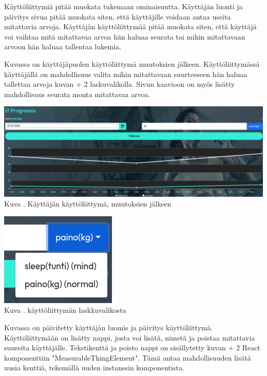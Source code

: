 



Käyttöliittymiä pitää muokata tukemaan ominaisuutta.
Käyttäjän luonti ja päivitys sivua pitää muokata siten, että käyttäjille voidaan antaa useita mitattavia arvoja.
Käyttäjän käyttöliittymää pitää muokata siten,
että käyttäjä voi vaihtaa mitä mitattavaa arvoa hän haluaa seurata tai mihin mitattavaan arvoon hän haluaa tallentaa lukemia.
\medskip

Kuvassa \nextImageCount{} on käyttäjäpuolen käyttöliittymä muutoksien jälkeen.
Käyttöliittymässä käyttäjällä on mahdollisuus valita mihin mitattavaan suurteeseen hän haluaa tallettaa arvoja kuvan {\the\numexpr \theimgCounter + 2 } laskuvalikolla.
Sivun kaavioon on myös lisätty mahdollisuus seurata monta mitattavaa arvoa.
\medskip

\bigskip
\includegraphics[width = 15cm]{src/public/progressmulti.png}\\
Kuva \getImgCount {}. Käyttäjän käyttöliittymä, muutoksien jälkeen 
\medskip

\bigskip
\includegraphics{src/public/progressselect.png}\\
Kuva \getImgCount {}. käyttöliittymän laskkuvalikosta
\medskip



Kuvassa \nextImageCount {} on päivitetty käyttäjän luomis ja päivitys käyttöliittymä.
Käyttöliittymään on lisätty nappi, josta voi lisätä, nimetä ja poistaa mitattavia suureita käyttäjälle.
Tekstikenttä ja poisto nappi on sisällytetty kuvan {\the\numexpr \theimgCounter + 2 } React komponenttiin "MeasurableThingElement". 
Tämä antaa mahdollisuuden lisätä uusia kenttiä, tekemällä uuden instanssin komponentista.
%

